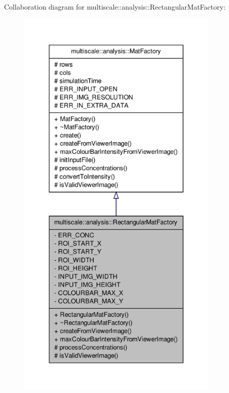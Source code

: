 \-Collaboration diagram for multiscale\-:\-:analysis\-:\-:\-Rectangular\-Mat\-Factory\-:
\nopagebreak
\begin{figure}[H]
\begin{center}
\leavevmode
\includegraphics[height=550pt]{classmultiscale_1_1analysis_1_1RectangularMatFactory__coll__graph}
\end{center}
\end{figure}
